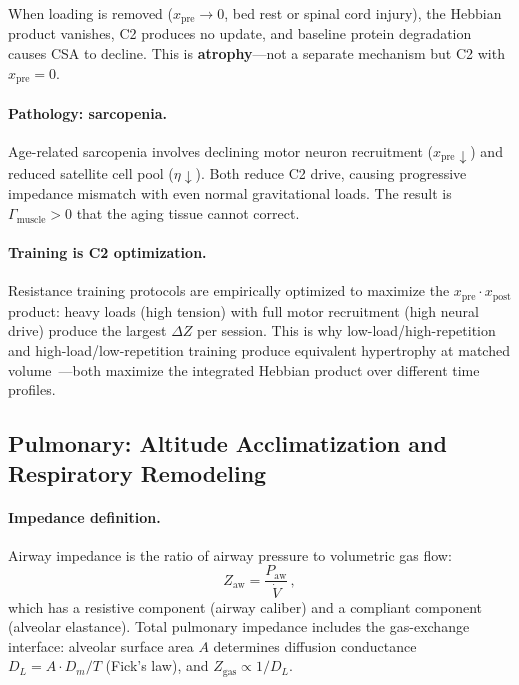 \documentclass[aps,pre,twocolumn,superscriptaddress,floatfix]{revtex4-2}
\begin{document}
When loading is removed ($x_{\text{pre}} \to 0$,
bed rest or spinal cord injury), the Hebbian
product vanishes, C2 produces no update, and
baseline protein degradation causes CSA to decline.
This is \textbf{atrophy}---not a separate mechanism
but C2 with $x_{\text{pre}} = 0$.

\paragraph{Pathology: sarcopenia.}
Age-related sarcopenia involves declining motor
neuron recruitment ($x_{\text{pre}} \downarrow$)
and reduced satellite cell pool ($\eta \downarrow$).
Both reduce C2 drive, causing progressive
impedance mismatch with even normal gravitational
loads.  The result is $\Gamma_{\text{muscle}} > 0$
that the aging tissue cannot correct.

\paragraph{Training is C2 optimization.}
Resistance training protocols are empirically
optimized to maximize the $x_{\text{pre}} \cdot
x_{\text{post}}$ product: heavy loads (high tension)
with full motor recruitment (high neural drive)
produce the largest $\Delta Z$ per session.
This is why low-load/high-repetition and
high-load/low-repetition training produce
equivalent hypertrophy at matched
volume~\cite{Schoenfeld2017}---both maximize
the integrated Hebbian product over different
time profiles.


\subsection{Pulmonary: Altitude Acclimatization and Respiratory Remodeling}
\label{sec:pulmonary}

\paragraph{Impedance definition.}
Airway impedance is the ratio of airway pressure
to volumetric gas flow:
\begin{equation}
  Z_{\text{aw}} = \frac{P_{\text{aw}}}{\dot{V}}\,,
  \label{eq:z-aw}
\end{equation}
which has a resistive component (airway caliber)
and a compliant component (alveolar elastance).
Total pulmonary impedance includes the gas-exchange
interface: alveolar surface area $A$ determines
diffusion conductance $D_L = A \cdot D_m / T$
(Fick's law), and $Z_{\text{gas}} \propto 1/D_L$.
\end{document}
